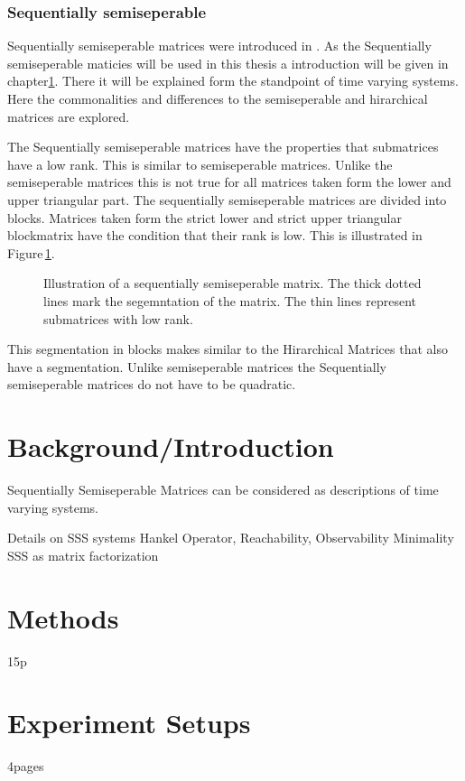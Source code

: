 \documentclass[doctype=mastersthesis,BCOR=15mm,biblatex]{ldvbook}%
\begin{document}
\subsection{Sequentially semiseperable}
Sequentially semiseperable matrices were introduced in \cite{dewilde_time-varying_1998}.
As the Sequentially semiseperable maticies will be used in this thesis a introduction will be given in chapter\ref{chap:background}. 
There it will be explained form the standpoint of time varying systems.
Here the commonalities and differences to the semiseperable and hirarchical matrices are explored.

The Sequentially semiseperable matrices have the properties that submatrices have a low rank.
This is similar to semiseperable matrices. 
Unlike the semiseperable matrices this is not true for all matrices taken form the lower and upper triangular part.
The sequentially semiseperable matrices are divided into blocks.
Matrices taken form the strict lower and strict upper triangular blockmatrix have the condition that their rank is low.
This is illustrated in Figure\,\ref{fig:sequentiallysep}.

\begin{figure}
	\centering
	
	\caption{Illustration of a sequentially semiseperable matrix. The thick dotted lines mark the segemntation of the matrix. The thin lines represent submatrices with low rank.}
	\label{fig:sequentiallysep}
\end{figure}

This segmentation in blocks makes similar to the Hirarchical Matrices that also have a segmentation.
Unlike semiseperable matrices the Sequentially semiseperable matrices do not have to be quadratic. 

\chapter{Background/Introduction}\label{chap:background}

Sequentially Semiseperable Matrices can be considered as descriptions of time varying systems.

Details on SSS systems
Hankel Operator, Reachability, Observability
Minimality
SSS as matrix factorization


\chapter{Methods} 15p

\chapter{Experiment Setups}
4pages
\end{document}
